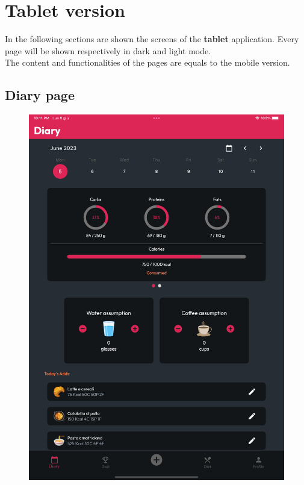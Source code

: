 \documentclass{Configuration_Files/PoliMi3i_thesis}
\begin{document}
\section{Tablet version}
In the following sections are shown the screens of the \textbf{tablet} application.
Every page will be shown respectively in dark and light mode. \\
The content and functionalities of the pages are equals to the mobile version.

\subsection{Diary page}

\begin{figure}[!h]
  \centering
  \includegraphics[scale=0.1]{Images/Screenshots/Tablet/DiaryTablet.png}

\end{figure}
\end{document}
